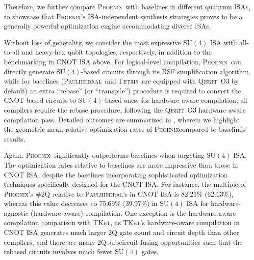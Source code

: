 \documentclass[conference]{IEEEtran}
\newcommand{\dquote}[1]{``#1''}
\newcommand{\phoenix}{\textsc{Phoenix}}
\newcommand{\qiskit}{\textsc{Qiskit}}
\newcommand{\tket}{\textsc{TKet}}
\newcommand{\tetris}{\textsc{Tetris}}
\newcommand{\paulihedral}{\textsc{Paulihedral}}
\newcommand{\CNOT}{\mathrm{CNOT}}
\newcommand{\SUfour}{\mathrm{SU}(4)}
\begin{document}
    Therefore, we further compare \phoenix\ with baselines in different quantum ISAs, to showcase that \phoenix's ISA-independent synthesis strategies proves to be a generally powerful optimization engine accommodating diverse ISAs.
    
    Without loss of generality, we consider the most expressive $\SUfour$ ISA with all-to-all and heavy-hex qubit topologies, respectively, in addition to the benchmarking in $ \CNOT $ ISA above. For logical-level compilation, \phoenix\ can directly generate $ \SUfour $-based circuits through its BSF simplification algorithm, while for baselines (\paulihedral\ and \tetris\ are equipped with \qiskit\ O3 by default) an extra \dquote{rebase} (or \dquote{transpile}) procedure is required to convert the $ \CNOT $-based circuits to $ \SUfour $-based ones; for hardware-aware compilation, all compilers require the rebase procedure, following the \qiskit\ O3 hardware-aware compilation pass. Detailed outcomes are summarized in , wherein we highlight the geometric-mean relative optimization rates of \phoenix compared to baselines' results.

    Again, \phoenix\ significantly outperforms baselines when targeting $ \SUfour $ ISA. The optimization rates relative to baselines are more impressive than those in $ \CNOT $ ISA, despite the baselines incorporating sophisticated optimization techniques specifically designed for the $ \CNOT $ ISA. For instance, the multiple of \phoenix's \#2Q relative to \paulihedral's in $ \CNOT $ ISA is 82.21\% (62.63\%), whereas this value decreases to 75.69\% (39.97\%) in $ \SUfour $ ISA for hardware-agnostic (hardware-aware) compilation. One exception is the hardware-aware compilation comparison with \tket, as \tket's hardware-aware compilation in $ \CNOT $ ISA generates much larger 2Q gate count and circuit depth than other compilers, and there are many 2Q subcircuit fusing opportunities such that the rebased circuits involves much fewer $ \SUfour $ gates.
\end{document}
